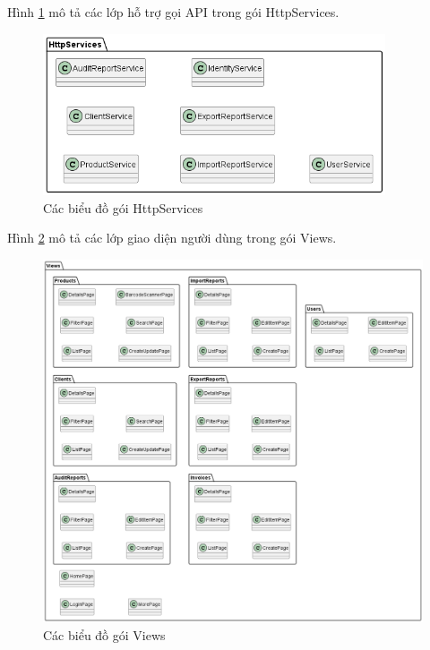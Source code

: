 \documentclass[../DoAn.tex]{subfiles}
\begin{document}
Hình \ref{fig:systemdesign-package-client-httpservices} mô tả các lớp hỗ trợ gọi API trong gói HttpServices.
\begin{figure}[H]
    \centering
    \includegraphics[width=0.9\textwidth]{Hinhve/design/package/client/HttpServices}
    \caption{Các biểu đồ gói HttpServices}
    \label{fig:systemdesign-package-client-httpservices}
\end{figure}

Hình \ref{fig:systemdesign-package-client-views} mô tả các lớp giao diện người dùng trong gói Views.
\begin{figure}[H]
    \centering
    \includegraphics[width=1\textwidth]{Hinhve/design/package/client/Views}
    \caption{Các biểu đồ gói Views}
    \label{fig:systemdesign-package-client-views}
\end{figure}
\break
\end{document}
